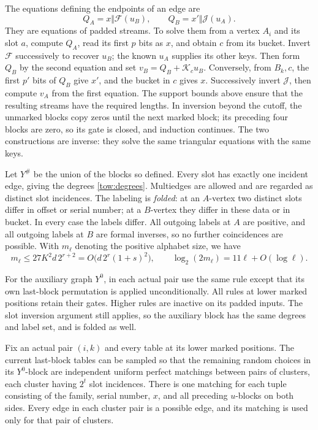 The equations defining the endpoints of an edge are
\begin{equation}
 Q_A=x\Vert\mathcal F(u_B),\qquad
 Q_B=x'\Vert\mathcal J(u_A).
 \label{tow:edge-equations}
\end{equation}
They are equations of padded streams.  To solve them from a vertex
\(A_i\) and its slot \(a\), compute \(Q_A\), read its first
\(p\) bits as \(x\), and obtain \(c\) from its bucket.  Invert
\(\mathcal F\) successively to recover \(u_B\); the known
\(u_A\) supplies its other keys.  Then form \(Q_B\) by the second
equation and set \(v_B=Q_B+\mathcal K_cu_B\).  Conversely, from
\(B_k,c\), the first \(p'\) bits of \(Q_B\) give \(x'\), and
the bucket in \(c\) gives \(x\).  Successively invert
\(\mathcal J\), then compute \(v_A\) from the first equation.
The support bounds above ensure that the resulting streams have the
required lengths.  In inversion beyond the cutoff, the unmarked
blocks copy zeros until the next marked block; its preceding four
blocks are zero, so its gate is closed, and induction continues.
The two constructions are inverse: they solve the same triangular
equations with the same keys.

Let \(Y^\#\) be the union of the blocks so defined.  Every slot has
exactly one incident edge, giving the degrees
\eqref{tow:degrees}.  Multiedges are allowed and are regarded as
distinct slot incidences.  The labeling is \emph{folded}: at an
\(A\)-vertex two distinct slots differ in offset or serial number;
at a \(B\)-vertex they differ in these data or in bucket.  In every
case the labels differ.  All outgoing labels at \(A\) are positive,
and all outgoing labels at \(B\) are formal inverses, so no further
coincidences are possible.  With \(m_\ell\) denoting the positive
alphabet size, we have
\begin{equation}
 m_\ell\leq 27K^2 d\,2^{r+2}
      =O\bigl(d\,2^r(1+s)^2\bigr),\qquad
 \log_2(2m_\ell)=11\ell+O(\log\ell).
 \label{tow:alphabet}
\end{equation}

For the auxiliary graph \(Y^0\), in each actual pair use the same
rule except that its own last-block permutation is applied
unconditionally.  All rules at lower marked positions retain their
gates.  Higher rules are inactive on its padded inputs.  The slot
inversion argument still applies, so the auxiliary block has the same
degrees and label set, and is folded as well.

\begin{lemma}
\label{tow:matching-clusters}
Fix an actual pair \((i,k)\) and every table at its lower marked
positions.  The current last-block tables can be sampled so that the
remaining random choices in its \(Y^0\)-block are independent uniform
perfect matchings between pairs of clusters, each cluster having
\(2^t\) slot incidences.  There is one matching for each tuple
consisting of the family, serial number, \(x\), and all preceding
\(u\)-blocks on both sides.  Every edge in each cluster pair is a
possible edge, and its matching is used only for that pair of clusters.
\end{lemma}

